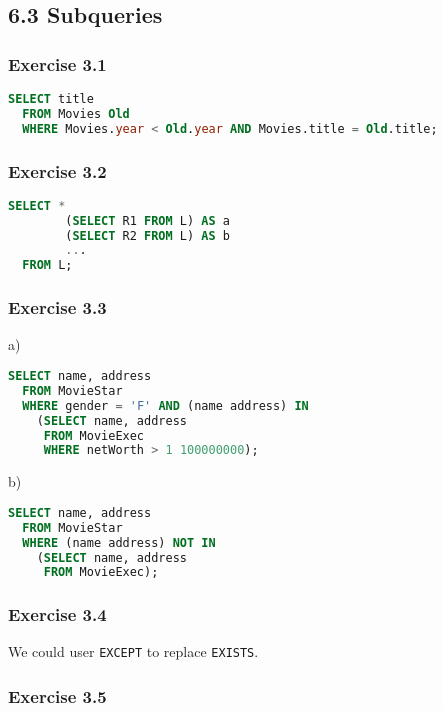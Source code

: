 \documentclass[../../main.tex]{subfiles}
\begin{document}
\subsection{6.3 Subqueries}

\subsubsection*{Exercise 3.1}

\begin{lstlisting}[language=sql]
  SELECT title
  FROM Movies Old
  WHERE Movies.year < Old.year AND Movies.title = Old.title;
\end{lstlisting}

\subsubsection*{Exercise 3.2}

\begin{lstlisting}[language=sql]
  SELECT *
        (SELECT R1 FROM L) AS a
        (SELECT R2 FROM L) AS b
        ...
  FROM L;
\end{lstlisting}

\subsubsection*{Exercise 3.3}

a)

\begin{lstlisting}[language=sql]
  SELECT name, address
  FROM MovieStar
  WHERE gender = 'F' AND (name address) IN
    (SELECT name, address
     FROM MovieExec
     WHERE netWorth > 1 100000000);
\end{lstlisting}

b)

\begin{lstlisting}[language=sql]
  SELECT name, address
  FROM MovieStar
  WHERE (name address) NOT IN
    (SELECT name, address
     FROM MovieExec);
\end{lstlisting}

\subsubsection*{Exercise 3.4}

We could user \verb|EXCEPT| to replace \verb|EXISTS|.

\subsubsection*{Exercise 3.5}
\end{document}
